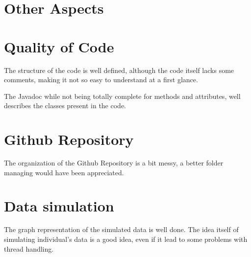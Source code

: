 \section{Other Aspects}



\section{Quality of Code}

The structure of the code is well defined, although the code itself lacks some comments, making it not so easy to understand at a first glance. 

The Javadoc while not being totally complete for methods and attributes, well describes the classes present in the code.


\section{Github Repository}

The organization of the Github Repository is a bit messy, a better folder managing would have been appreciated.


\section{Data simulation}

The graph representation of the simulated data is well done. The idea itself of simulating individual's data is a good idea, even if it lead to some problems with thread handling.



